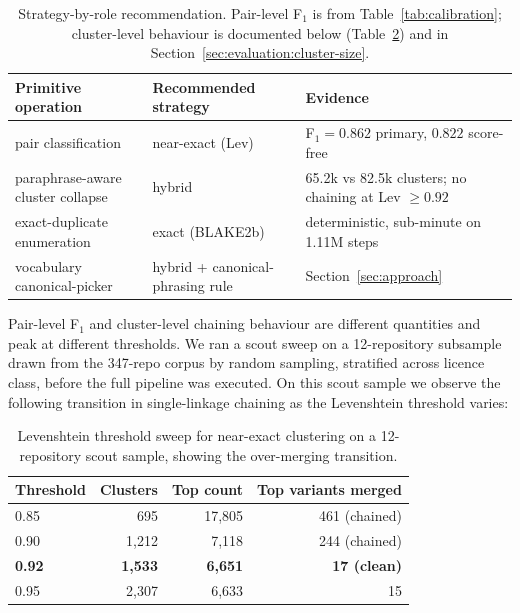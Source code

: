 \documentclass[11pt,a4paper]{article}
\begin{document}
\begin{table}[h]
\centering
\caption{Strategy-by-role recommendation. Pair-level F$_1$ is from
Table~\ref{tab:calibration}; cluster-level behaviour is documented
below (Table~\ref{tab:knee}) and in
Section~\ref{sec:evaluation:cluster-size}.}
\label{tab:strategy-role}
\footnotesize
\setlength{\tabcolsep}{4pt}
\begin{tabular}{p{3.9cm}p{3.1cm}p{7.2cm}}
\toprule
Primitive operation & Recommended strategy & Evidence \\
\midrule
pair classification                  & near-exact (Lev) & F$_1 = 0.862$ primary, $0.822$ score-free \\
paraphrase-aware cluster collapse    & hybrid           & 65.2k vs 82.5k clusters; no chaining at Lev $\geq 0.92$ \\
exact-duplicate enumeration          & exact (BLAKE2b)  & deterministic, sub-minute on 1.11M steps \\
vocabulary canonical-picker          & hybrid + canonical-phrasing rule & Section~\ref{sec:approach} \\
\bottomrule
\end{tabular}
\end{table}

Pair-level F$_1$ and cluster-level chaining behaviour are
different quantities and peak at different thresholds. We ran a
scout sweep on a 12-repository subsample drawn from the 347-repo
corpus by random sampling, stratified across licence class, before
the full pipeline was executed. On this scout sample we observe
the following transition in single-linkage chaining as the
Levenshtein threshold varies:

\begin{table}[h]
\centering
\caption{Levenshtein threshold sweep for near-exact clustering on a
12-repository scout sample, showing the over-merging transition.}
\label{tab:knee}
\begin{tabular}{lrrr}
\toprule
Threshold & Clusters & Top count & Top variants merged \\
\midrule
0.85 &   695 & 17{,}805 & 461 (chained) \\
0.90 & 1{,}212 &  7{,}118 & 244 (chained) \\
\textbf{0.92} & \textbf{1{,}533} & \textbf{6{,}651} & \textbf{17 (clean)} \\
0.95 & 2{,}307 &  6{,}633 & 15 \\
\bottomrule
\end{tabular}
\end{table}
\end{document}
